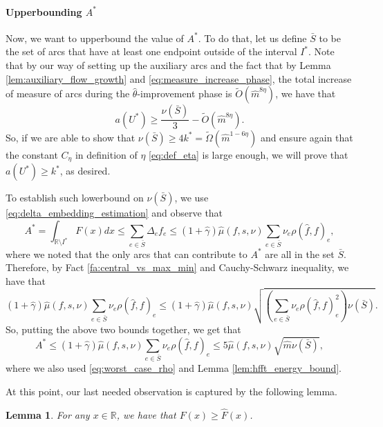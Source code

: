 \documentclass[11pt, letterpaper]{article}
\newtheorem{lemma}[theorem]{Lemma}
\newcommand{\ceta}{C_{\eta}}
\newcommand{\bbR}{\mathbb{R}}
\newcommand{\tO}[1]{\widetilde{O}(#1)}
\newcommand{\tOm}[1]{\widetilde{\Omega}(#1)}
\newcommand{\hF}{\widehat{F}}
\newcommand{\hm}{\widehat{m}}
\newcommand{\oS}{\bar{S}}
\newcommand{\hmu}{\hat{\mu}}
\newcommand{\hgamma}{\hat{\gamma}}
\newcommand{\htheta}{\hat{\theta}}
\newcommand{\vnu}{\boldsymbol{\mathit{\nu}}}
\renewcommand{\aa}{\boldsymbol{\mathit{a}}}
\newcommand{\ff}{\boldsymbol{\mathit{f}}}
\newcommand{\hff}{\boldsymbol{\mathit{\hat{f}}}}
\renewcommand{\ss}{\boldsymbol{\mathit{s}}}
\begin{document}
\paragraph{Upperbounding $A^*$} Now, we want to upperbound the value of $A^*$. To do that, let us define $\oS$ to be the set of arcs that have at least one endpoint outside of the interval $I^*$. Note that by our way of setting up the auxiliary arcs and the fact that by Lemma \ref{lem:auxiliary_flow_growth} and \eqref{eq:measure_increase_phase}, the total increase of measure of arcs during the $\htheta$-improvement phase is $\tO{\hm^{8\eta}}$, we have that
\begin{equation}
\label{eq:precond_os_vs_ustar}
\aa(U^*)\geq \frac{\vnu(\oS)}{3}-\tO{\hm^{8\eta}}.
\end{equation} 
So, if we are able to show that $\vnu(\oS)\geq 4k^* = \tOm{\hm^{1-6\eta}}$ and ensure again that the constant $\ceta$ in definition of $\eta$ \eqref{eq:def_eta} is large enough, we will prove that $\aa(U^*)\geq k^*$, as desired. 


To establish such lowerbound on $\vnu(\oS)$, we use \eqref{eq:delta_embedding_estimation} and observe that
\begin{equation*}
A^*=\int_{\bbR\setminus I^*} F(x) dx \leq \sum_{e\in \oS} \Delta_e f_e \leq (1+\hgamma) \hmu(\ff,\ss,\vnu) \sum_{e\in \oS} \nu_e \rho(\hff,\ff)_e,
\end{equation*}
where we noted that the only arcs that can contribute to $A^*$ are all in the set $\oS$. 
Therefore, by Fact \ref{fa:central_vs_max_min} and Cauchy-Schwarz inequality, we have that
\[
(1+\hgamma) \hmu(\ff,\ss,\vnu) \sum_{e\in \oS} \nu_e \rho(\hff,\ff)_e \leq (1+\hgamma) \hmu(\ff,\ss,\vnu) \sqrt{(\sum_{e\in \oS} \nu_e \rho(\hff,\ff)_e^2) \vnu(\oS)}.
\]
So, putting the above two bounds together, we get that
\begin{equation}\label{eq:upperbound_on_A_star}
A^*\leq (1+\hgamma) \hmu(\ff,\ss,\vnu) \sum_{e\in \oS} \nu_e \rho(\hff,\ff)_e \leq 5\hmu(\ff,\ss,\vnu) \sqrt{\hm\vnu(\oS)},
\end{equation}
where we also used \eqref{eq:worst_case_rho} and Lemma \ref{lem:hfft_energy_bound}.

At this point, our last needed observation is captured by the following lemma.
\begin{lemma}
\label{lem:Astar_vs_Ahat}
For any $x\in \bbR$, we have that $F(x)\geq\hF(x)$.
\end{lemma} 
\end{document}
